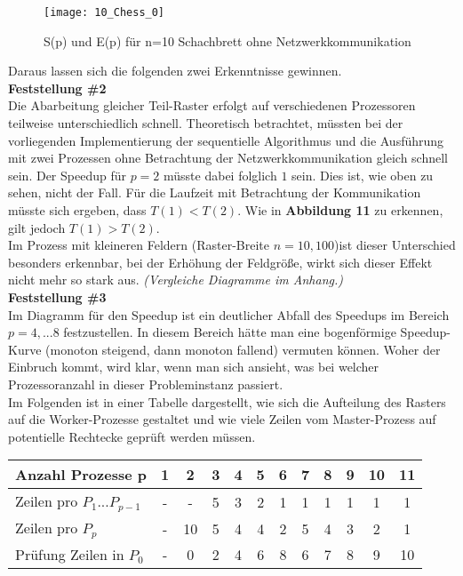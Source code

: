 \documentclass[
10pt, %
a4paper, %
oneside, %
headinclude,footinclude, %
BCOR5mm, %
]{scrartcl}
\begin{document}
\begin{figure}[h]
	\centering 
	\texttt{[image: 10\_Chess\_0]} 
	\caption[S(p) und E(p) für n=10 Schachbrett ohne Netzwerkkomm.]{S(p) und E(p) für n=10 Schachbrett ohne Netzwerkkommunikation}
\end{figure}

Daraus lassen sich die folgenden zwei Erkenntnisse gewinnen.\\

\textbf{Feststellung \#2}\\
Die Abarbeitung gleicher Teil-Raster erfolgt auf verschiedenen Prozessoren teilweise unterschiedlich schnell. Theoretisch betrachtet, müssten bei der vorliegenden Implementierung der sequentielle Algorithmus und die Ausführung mit zwei Prozessen ohne Betrachtung der Netzwerkkommunikation gleich schnell sein. Der Speedup für \(p=2\) müsste dabei folglich \(1\) sein. Dies ist, wie oben zu sehen, nicht der Fall. Für die Laufzeit mit Betrachtung der Kommunikation müsste sich ergeben, dass \(T(1)<T(2)\). Wie in \textbf{Abbildung 11} zu erkennen, gilt jedoch \(T(1)>T(2)\).\\
Im Prozess mit kleineren Feldern (Raster-Breite \(n= {10,100}\))ist dieser Unterschied besonders erkennbar, bei der Erhöhung der Feldgröße, wirkt sich dieser Effekt nicht mehr so stark aus. \textit{(Vergleiche Diagramme im Anhang.)}\\

\textbf{Feststellung \#3}\\
Im Diagramm für den Speedup ist ein deutlicher Abfall des Speedups im Bereich \(p={4,...8}\) festzustellen. In diesem Bereich hätte man eine bogenförmige Speedup-Kurve (monoton steigend, dann monoton fallend) vermuten können. Woher der Einbruch kommt, wird klar, wenn man sich ansieht, was bei welcher Prozessoranzahl in dieser Probleminstanz passiert.\\
Im Folgenden ist in einer Tabelle dargestellt, wie sich die Aufteilung des Rasters auf die Worker-Prozesse gestaltet und wie viele Zeilen vom Master-Prozess auf potentielle Rechtecke geprüft werden müssen.\\

\begin{tabular}{l|c|c|c|c|c|c|c|c|c|c|c|}
\hline 
Anzahl Prozesse p & 1 & 2 & 3 & 4 & 5 & 6 & 7 & 8  & 9 &  10 & 11\\ 
\hline 
Zeilen pro \(P_1 ... P_{p-1}\) & - & - & 5 & 3 & 2 & 1 & 1 & 1  & 1 &  1 & 1\\
\hline 
Zeilen pro \(P_{p}\) & - & 10 & 5 & 4 & 4 & 2 & 5 & 4  & 3 &  2 & 1\\
\hline 
Prüfung Zeilen in \(P_{0}\) & - & 0 & 2 & 4 & 6 & 8 & 6 & 7  & 8 &  9 & 10\\
\hline 
\end{tabular}\\
\end{document}
